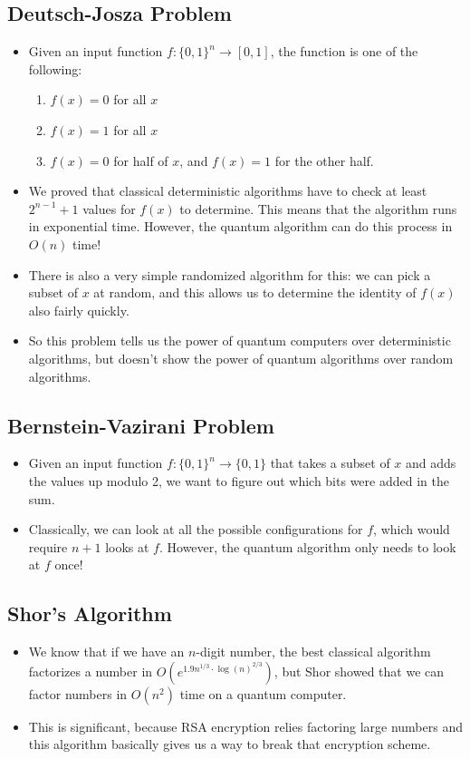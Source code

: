 \subsection{Deutsch-Josza Problem}
\begin{itemize}
	\item Given an input function \( f: \{0, 1\} ^{n} \to [0, 1] \), the function is one of the following:
		\begin{enumerate}[label=\roman*)]
			\item \( f(x) = 0 \) for all \( x \) 
			\item \( f(x) = 1 \) for all \( x \) 
			\item \( f(x) = 0 \) for half of \( x \), and \( f(x) = 1 \) for the other half. 
		\end{enumerate}
	\item We proved that classical deterministic algorithms have to check at least \( 2^{n-1} +1 \) values 
		for \( f(x) \) to determine. This means that the algorithm runs in exponential time. However, 
		the quantum algorithm can do this process in \( O(n) \) time!
	\item There is also a very simple randomized algorithm for this: we can pick a subset of \( x \) at random,
		and this allows us to determine the identity of \( f(x) \) also fairly quickly.
	\item So this problem tells us the power of quantum computers over deterministic algorithms, but doesn't 
		show the power of quantum algorithms over random algorithms. 
\end{itemize}
\subsection{Bernstein-Vazirani Problem}
\begin{itemize}
	\item Given an input function \( f: \{0, 1\} ^{n} \to \{0, 1\}  \) that takes a subset of \( x \) and 
		adds the values up modulo 2, we want to figure out which bits were added in the sum.  
	\item Classically, we can look at all the possible configurations for \( f \), which would require 
		\( n+1 \) looks at \( f \). However, the quantum algorithm only needs to look at \( f \) once!
\end{itemize}
\subsection{Shor's Algorithm}
\begin{itemize}
	\item We know that if we have an \( n \)-digit number, the best classical algorithm factorizes a number in 
		\( O(e^{1.9 n^{1 / 3} \cdot \log(n)^{2 / 3}}) \), but Shor showed that we can factor numbers 
		in \( O(n^2) \) time on a quantum computer. 
	\item This is significant, because RSA encryption relies factoring large numbers and this algorithm basically 
		gives us a way to break that encryption scheme. 
\end{itemize}
